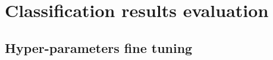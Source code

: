\chapter{Classification results evaluation} \label{chapt4}
\section{Hyper-parameters fine tuning} \label{sect4_1}


